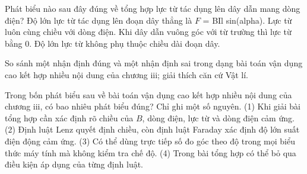 \begin{ex}
Phát biểu nào sau đây đúng về tổng hợp lực từ tác dụng lên dây dẫn mang dòng điện?
\choice
{\True Độ lớn lực từ tác dụng lên đoạn dây thẳng là $F$ = BIl sin(alpha).}
{Lực từ luôn cùng chiều với dòng điện.}
{Khi dây dẫn vuông góc với từ trường thì lực từ bằng 0.}
{Độ lớn lực từ không phụ thuộc chiều dài đoạn dây.}
\end{ex}

\begin{bt}
So sánh một nhận định đúng và một nhận định sai trong dạng bài toán vận dụng cao kết hợp nhiều nội dung của chương iii; giải thích căn cứ Vật lí.
\end{bt}

\begin{ex}
Trong bốn phát biểu sau về bài toán vận dụng cao kết hợp nhiều nội dung của chương iii, có bao nhiêu phát biểu đúng? Chỉ ghi một số nguyên. (1) Khi giải bài tổng hợp cần xác định rõ chiều của $B$, dòng điện, lực từ và dòng điện cảm ứng. (2) Định luật Lenz quyết định chiều, còn định luật Faraday xác định độ lớn suất điện động cảm ứng. (3) Có thể dùng trực tiếp số đo góc theo độ trong mọi biểu thức máy tính mà không kiểm tra chế độ. (4) Trong bài tổng hợp có thể bỏ qua điều kiện áp dụng của từng định luật.
\end{ex}

